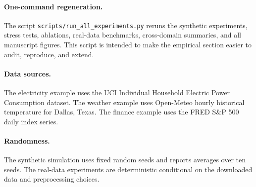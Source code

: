 \documentclass[11pt]{article}
\begin{document}
\paragraph{One-command regeneration.}
The script \texttt{scripts/run\_all\_experiments.py} reruns the synthetic experiments, stress tests, ablations, real-data benchmarks, cross-domain summaries, and all manuscript figures. This script is intended to make the empirical section easier to audit, reproduce, and extend.

\paragraph{Data sources.}
The electricity example uses the UCI Individual Household Electric Power Consumption dataset. The weather example uses Open-Meteo hourly historical temperature for Dallas, Texas. The finance example uses the FRED S\&P 500 daily index series.

\paragraph{Randomness.}
The synthetic simulation uses fixed random seeds and reports averages over ten seeds. The real-data experiments are deterministic conditional on the downloaded data and preprocessing choices.



\end{document}
